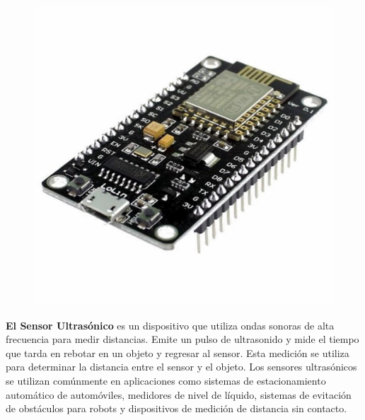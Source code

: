 \documentclass[journal]{IEEEtran}
\begin{document}
\begin{figure}[H]
\begin{center}
    \includegraphics[scale=0.15]{images/MODULO-WI-FI-NODEMCU-ESP8266-1200x1200.jpg}
    \end{center}
\end{figure}

\textbf{El Sensor Ultrasónico} es un dispositivo que utiliza ondas sonoras de alta frecuencia para medir distancias. Emite un pulso de ultrasonido y mide el tiempo que tarda en rebotar en un objeto y regresar al sensor. Esta medición se utiliza para determinar la distancia entre el sensor y el objeto. Los sensores ultrasónicos se utilizan comúnmente en aplicaciones como sistemas de estacionamiento automático de automóviles, medidores de nivel de líquido, sistemas de evitación de obstáculos para robots y dispositivos de medición de distancia sin contacto.
\end{document}
